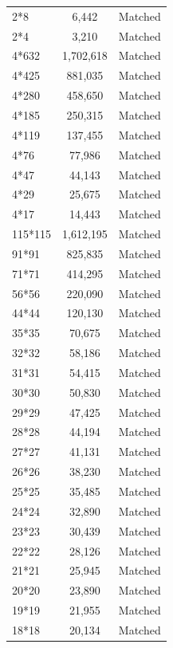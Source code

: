\documentclass[conference]{IEEEtran}
\begin{document}
\begin{table}[ht]
\begin{tabular}{lcl}
2*8        & 6,442           & Matched \\
2*4        & 3,210           & Matched \\
4*632      & 1,702,618       & Matched \\
4*425      & 881,035         & Matched \\
4*280      & 458,650         & Matched \\
4*185      & 250,315         & Matched \\
4*119      & 137,455         & Matched \\
4*76       & 77,986          & Matched \\
4*47       & 44,143          & Matched \\
4*29       & 25,675          & Matched \\
4*17       & 14,443          & Matched \\
115*115    & 1,612,195       & Matched \\
91*91      & 825,835         & Matched \\
71*71      & 414,295         & Matched \\
56*56      & 220,090         & Matched \\
44*44      & 120,130         & Matched \\
35*35      & 70,675          & Matched \\
32*32      & 58,186          & Matched \\
31*31      & 54,415          & Matched \\
30*30      & 50,830          & Matched \\
29*29      & 47,425          & Matched \\
28*28      & 44,194          & Matched \\
27*27      & 41,131          & Matched \\
26*26      & 38,230          & Matched \\
25*25      & 35,485          & Matched \\
24*24      & 32,890          & Matched \\
23*23      & 30,439          & Matched \\
22*22      & 28,126          & Matched \\
21*21      & 25,945          & Matched \\
20*20      & 23,890          & Matched \\
19*19      & 21,955          & Matched \\
18*18      & 20,134          & Matched \\

\end{tabular}
\end{table}
\end{document}
